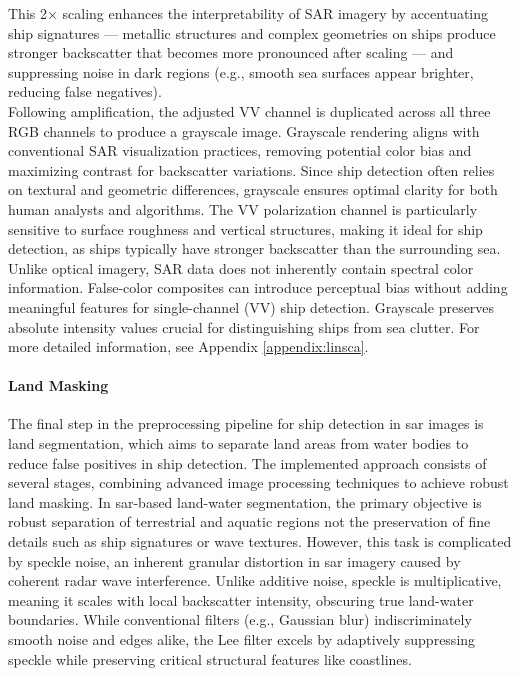 \documentclass{article}
\begin{document}
	This 2× scaling enhances the interpretability of SAR imagery by accentuating ship signatures — metallic structures and complex geometries on ships produce stronger backscatter that becomes more pronounced after scaling — and suppressing noise in dark regions (e.g., smooth sea surfaces appear brighter, reducing false negatives).\\
	
	Following amplification, the adjusted VV channel is duplicated across all three RGB channels to produce a grayscale image. Grayscale rendering aligns with conventional SAR visualization practices, removing potential color bias and maximizing contrast for backscatter variations. Since ship detection often relies on textural and geometric differences, grayscale ensures optimal clarity for both human analysts and algorithms. The VV polarization channel is particularly sensitive to surface roughness and vertical structures, making it ideal for ship detection, as ships typically have stronger backscatter than the surrounding sea.\\
	
	Unlike optical imagery, SAR data does not inherently contain spectral color information. False-color composites can introduce perceptual bias without adding meaningful features for single-channel (VV) ship detection. Grayscale preserves absolute intensity values crucial for distinguishing ships from sea clutter.
	For more detailed information, see Appendix \ref{appendix:linsca}.
	
	

	
	\paragraph{Land Masking}
	The final step in the preprocessing pipeline for ship detection in \acrshort{sar} images is land segmentation, which aims to separate land areas from water bodies to reduce false positives in ship detection. The implemented approach consists of several stages, combining advanced image processing techniques to achieve robust land masking. In \acrshort{sar}-based land-water segmentation, the primary objective is robust separation of terrestrial and aquatic regions not the preservation of fine details such as ship signatures or wave textures. However, this task is complicated by speckle noise, an inherent granular distortion in \acrshort{sar} imagery caused by coherent radar wave interference. Unlike additive noise, speckle is multiplicative, meaning it scales with local backscatter intensity, obscuring true land-water boundaries. While conventional filters (e.g., Gaussian blur) indiscriminately smooth noise and edges alike, the Lee filter excels by adaptively suppressing speckle while preserving critical structural features like coastlines.\\
	
\end{document}
